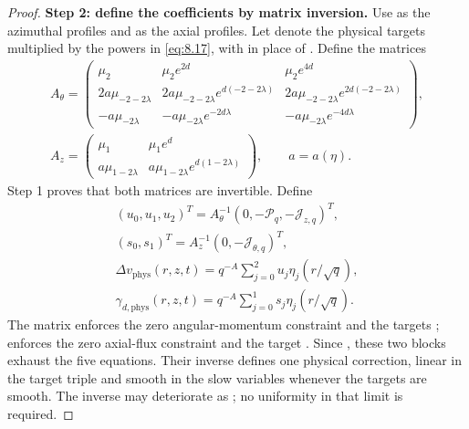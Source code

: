 \begin{proof}
%
\textbf{Step 2: define the coefficients by matrix inversion.} Use
 as the azimuthal profiles and
 as the axial profiles. Let
 denote the physical
targets multiplied by the powers in \eqref{eq:8.17}, with  in place of
. Define the matrices
\[
\begin{gathered}
A_\theta=
\begin{pmatrix}
\mu_2 & \mu_2e^{2d} & \mu_2e^{4d}\\
2a\mu_{-2-2\lambda} & 2a\mu_{-2-2\lambda}e^{d(-2-2\lambda)}
  & 2a\mu_{-2-2\lambda}e^{2d(-2-2\lambda)}\\
-a\mu_{-2\lambda} & -a\mu_{-2\lambda}e^{-2d\lambda}
  & -a\mu_{-2\lambda}e^{-4d\lambda}
\end{pmatrix},
\\[4pt]
A_z=
\begin{pmatrix}
\mu_1 & \mu_1e^d\\
a\mu_{1-2\lambda} & a\mu_{1-2\lambda}e^{d(1-2\lambda)}
\end{pmatrix},
\qquad a=a(\eta).
\end{gathered}
\]
Step 1 proves that both matrices are invertible. Define
\[
\begin{gathered}
(u_0,u_1,u_2)^T=A_\theta^{-1}(0,-\mathcal P_q,-\mathcal J_{z,q})^T,\\
(s_0,s_1)^T=A_z^{-1}(0,-\mathcal J_{\theta,q})^T,\\
\Delta v_{\mathrm{phys}}(r,z,t)=q^{-A}\sum_{j=0}^{2}u_j\eta_j(r/\sqrt q),\\
\gamma_{d,\mathrm{phys}}(r,z,t)=q^{-A}\sum_{j=0}^{1}s_j\eta_j(r/\sqrt q).
\end{gathered}
\]
The matrix  enforces the zero angular-momentum constraint and the
targets ;
 enforces the zero axial-flux constraint and the target
. Since , these two
blocks exhaust the five equations. Their inverse defines one physical correction, linear in the
target triple and smooth in the slow variables whenever the targets are smooth. The inverse may
deteriorate as ; no uniformity in that limit is required.


\end{proof}

